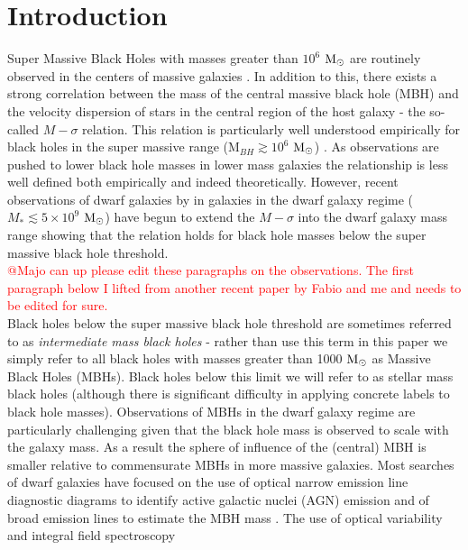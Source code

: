 \documentclass[twocolumn, tighten]{aastex631}
\newcommand{\msolar} {$\rm{M_{\odot}}~$}
\newcommand{\msolarc} {$\rm{M_{\odot}}$}
\begin{document}
\section{Introduction} \label{Sec:Introduction}
\noindent Super Massive Black Holes with masses greater than $10^6$ \msolar are routinely observed in the centers of massive galaxies \citep[e.g.][]{Faber_1997, Marconi_2004, Heckman_2014} . In addition to this, there exists a strong correlation between the mass of the central massive black hole (MBH) and the velocity dispersion of stars in the central region of the host galaxy - the so-called $M-\sigma$ relation. This relation is particularly well understood empirically for black holes in the super massive range (M$_{BH} \gtrsim 10^6$ \msolarc) \cite[e.g.][]{Magorrian_1998, Kormendy_2013}. As observations are pushed to lower black hole masses in lower mass galaxies the relationship is less well defined both empirically and indeed theoretically. However, recent observations of dwarf galaxies by \cite{Baldassare_2020} in galaxies 
in the dwarf galaxy regime ($M_{*} \lesssim 5 \times 10^9$ \msolarc) have begun to extend the 
$M-\sigma$ into the dwarf galaxy mass range showing that the relation holds for black hole masses below the super massive black hole threshold. \\
\textcolor{red}{@Majo can up please edit these paragraphs on the observations. The first paragraph below I lifted from another recent paper by Fabio and me and needs to be edited for sure. }\\ 
\indent Black holes below the super massive black hole threshold are sometimes referred to as \textit{intermediate mass black holes} - rather than use this term in this paper we simply refer to all black holes with masses greater than 1000 \msolar as Massive Black Holes (MBHs). Black holes below this limit we will refer to as stellar mass black holes (although there is significant difficulty in applying concrete labels to black hole masses). Observations of MBHs in the dwarf galaxy regime are particularly challenging given that the black hole mass is observed to scale with the 
galaxy mass. As a result the sphere of influence of the (central) MBH is smaller relative to commensurate MBHs in more massive galaxies. Most searches of dwarf 
galaxies have focused on the use of optical narrow emission line diagnostic diagrams to identify active galactic nuclei (AGN) emission and of broad emission lines
to estimate the MBH mass \citep{Greene_2004, Greene_2007, Reines_2013, Moran_2014, Chilingarian_2018}. The use of optical variability and integral field spectroscopy 
\end{document}
